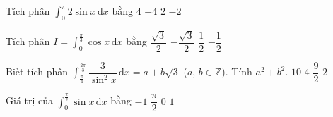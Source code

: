 

\begin{ex}%
	Tích  phân $\displaystyle \int_0^\pi 2\sin x \mathrm{\,d}x $ bằng
	\choice 
		 {\True $4$}
		{$-4$} 
		 {$2$}
		 {$-2$}
\end{ex}

\begin{ex}%
	Tích phân $I=\displaystyle\int_0^{\tfrac{\pi}{3}} \cos x\mathrm{\,d}x$  bằng
	\choice 
		 {\True $\dfrac{\sqrt{3}}{2}$}
		 {$-\dfrac{\sqrt{3}}{2}$}
		{$\dfrac{1}{2}$} 
		{$-\dfrac{1}{2}$} 
\end{ex}

\begin{ex}%
	Biết tích phân $\displaystyle \int_{\tfrac{\pi}{4}}^{\tfrac{2\pi}{3}}\dfrac{3}{\sin^2 x}\mathrm{\,d}x=a+b\sqrt{3}$ ($a$, $b \in  \mathbb{Z}$). Tính $a^2+b^2$.
	 \choice
		{\True  $10$}
		{$4$} 
		 {$\dfrac{9}{2}$}
		{$2$} 
\end{ex}

\begin{ex}%
	Giá trị của $\displaystyle\int_0^{\tfrac\pi2}{\sin x\mathrm{\,d}x}$ bằng 
	 \choice
		{$-1$} 
		 {$\dfrac\pi2$}
		{$0$} 
		{\True  $1$}
\end{ex}

